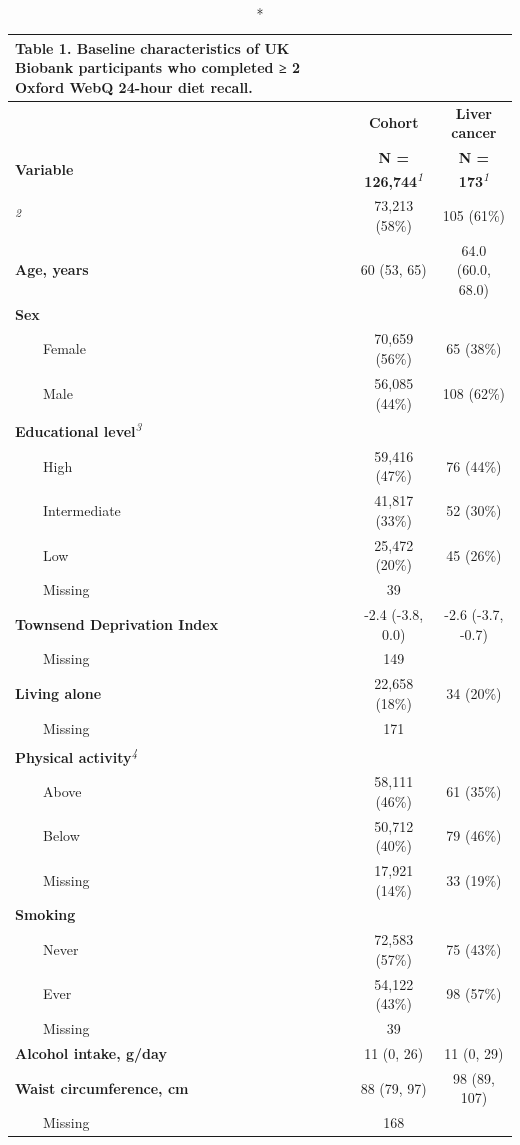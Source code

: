 \documentclass[sn-basic,Numbered,pdflatex]{sn-jnl}
\begin{document}
\begingroup
\setlength{}
\setlength{}\setlength{\LTpost}{0mm}
\begin{longtable}{@{\extracolsep{\fill}}lcc}
\caption*{
{\large \textbf{Table 1. Baseline characteristics of UK Biobank participants who completed ≥ 2 Oxford WebQ 24-hour diet recall.}}
} \\ 
\toprule
 & \textbf{Cohort} & \textbf{Liver cancer} \\ 
\cmidrule(lr){2-2} \cmidrule(lr){3-3}
\textbf{Variable} & \textbf{N = 126,744}\textsuperscript{\textit{1}} & \textbf{N = 173}\textsuperscript{\textit{1}} \\ 
\midrule\addlinespace[2.5pt]
{\bfseries Typical diet yesterday}\textsuperscript{\textit{2}} & 73,213 (58\%) & 105 (61\%) \\ 
{\bfseries Age, years} & 60 (53, 65) & 64.0 (60.0, 68.0) \\ 
{\bfseries Sex} &  &  \\ 
    Female & 70,659 (56\%) & 65 (38\%) \\ 
    Male & 56,085 (44\%) & 108 (62\%) \\ 
{\bfseries Educational level}\textsuperscript{\textit{3}} &  &  \\ 
    High & 59,416 (47\%) & 76 (44\%) \\ 
    Intermediate & 41,817 (33\%) & 52 (30\%) \\ 
    Low & 25,472 (20\%) & 45 (26\%) \\ 
    Missing & 39 &  \\ 
{\bfseries Townsend Deprivation Index} & -2.4 (-3.8, 0.0) & -2.6 (-3.7, -0.7) \\ 
    Missing & 149 &  \\ 
{\bfseries Living alone} & 22,658 (18\%) & 34 (20\%) \\ 
    Missing & 171 &  \\ 
{\bfseries Physical activity}\textsuperscript{\textit{4}} &  &  \\ 
    Above & 58,111 (46\%) & 61 (35\%) \\ 
    Below & 50,712 (40\%) & 79 (46\%) \\ 
    Missing & 17,921 (14\%) & 33 (19\%) \\ 
{\bfseries Smoking} &  &  \\ 
    Never & 72,583 (57\%) & 75 (43\%) \\ 
    Ever & 54,122 (43\%) & 98 (57\%) \\ 
    Missing & 39 &  \\ 
{\bfseries Alcohol intake, g/day} & 11 (0, 26) & 11 (0, 29) \\ 
{\bfseries Waist circumference, cm} & 88 (79, 97) & 98 (89, 107) \\ 
    Missing & 168 &  \\ 
\bottomrule
\end{longtable}
\end{document}
